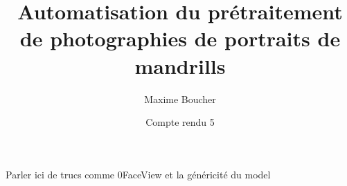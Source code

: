 \documentclass{article}
\title{Automatisation du prétraitement de photographies de portraits de mandrills}
\author{Maxime Boucher}
\date{Compte rendu 5}
\begin{document}
\maketitle

Parler ici de trucs comme 0FaceView et la généricité du model
\end{document}
